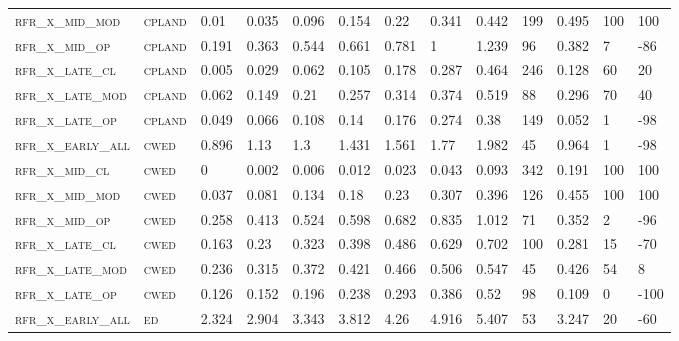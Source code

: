 \begin{landscape}
\begin{center}
\begin{footnotesize}
\begin{longtable}{lllllllllllll}
\textsc{rfr\_x\_mid\_mod  } & \textsc{cpland    }   & 0.01    & 0.035   & 0.096    & 0.154    & 0.22     & 0.341    & 0.442    & 199  & 0.495   & 100 & 100   \\
\textsc{rfr\_x\_mid\_op   } & \textsc{cpland    }   & 0.191   & 0.363   & 0.544    & 0.661    & 0.781    & 1        & 1.239    & 96   & 0.382   & 7   & -86   \\
\textsc{rfr\_x\_late\_cl  } & \textsc{cpland    }   & 0.005   & 0.029   & 0.062    & 0.105    & 0.178    & 0.287    & 0.464    & 246  & 0.128   & 60  & 20    \\
\textsc{rfr\_x\_late\_mod } & \textsc{cpland    }   & 0.062   & 0.149   & 0.21     & 0.257    & 0.314    & 0.374    & 0.519    & 88   & 0.296   & 70  & 40    \\
\textsc{rfr\_x\_late\_op  } & \textsc{cpland    }   & 0.049   & 0.066   & 0.108    & 0.14     & 0.176    & 0.274    & 0.38     & 149  & 0.052   & 1   & -98   \\
\textsc{rfr\_x\_early\_all} & \textsc{cwed      }   & 0.896   & 1.13    & 1.3      & 1.431    & 1.561    & 1.77     & 1.982    & 45   & 0.964   & 1   & -98   \\
\textsc{rfr\_x\_mid\_cl   } & \textsc{cwed      }   & 0       & 0.002   & 0.006    & 0.012    & 0.023    & 0.043    & 0.093    & 342  & 0.191   & 100 & 100   \\
\textsc{rfr\_x\_mid\_mod  } & \textsc{cwed      }   & 0.037   & 0.081   & 0.134    & 0.18     & 0.23     & 0.307    & 0.396    & 126  & 0.455   & 100 & 100   \\
\textsc{rfr\_x\_mid\_op   } & \textsc{cwed      }   & 0.258   & 0.413   & 0.524    & 0.598    & 0.682    & 0.835    & 1.012    & 71   & 0.352   & 2   & -96   \\
\textsc{rfr\_x\_late\_cl  } & \textsc{cwed      }   & 0.163   & 0.23    & 0.323    & 0.398    & 0.486    & 0.629    & 0.702    & 100  & 0.281   & 15  & -70   \\
\textsc{rfr\_x\_late\_mod } & \textsc{cwed      }   & 0.236   & 0.315   & 0.372    & 0.421    & 0.466    & 0.506    & 0.547    & 45   & 0.426   & 54  & 8     \\
\textsc{rfr\_x\_late\_op  } & \textsc{cwed      }   & 0.126   & 0.152   & 0.196    & 0.238    & 0.293    & 0.386    & 0.52     & 98   & 0.109   & 0   & -100  \\
\textsc{rfr\_x\_early\_all} & \textsc{ed        }   & 2.324   & 2.904   & 3.343    & 3.812    & 4.26     & 4.916    & 5.407    & 53   & 3.247   & 20  & -60   \\

\end{longtable}
\end{footnotesize}
\end{center}
\end{landscape}
